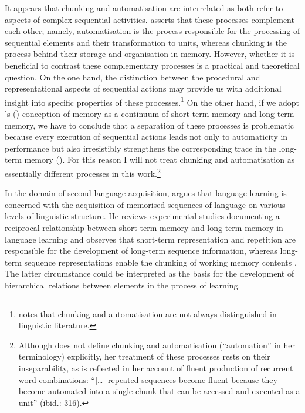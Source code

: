\noindent It appears that chunking and automatisation are interrelated as both refer to aspects of complex sequential activities. \citet[][20]{diessel-toappear} asserts that these processes complement each other; namely, automatisation is the process responsible for the processing of sequential elements and their transformation to units, whereas chunking is the process behind their storage and organisation in memory. However, whether it is beneficial to contrast these complementary processes is a practical and theoretical question. On the one hand, the distinction between the procedural and representational aspects of sequential actions may provide us with additional insight into specific properties of these processes.\footnote{\citet{diessel-toappear} notes that chunking and automatisation are not always distinguished in linguistic literature.} On the other hand, if we adopt \citeauthor{melton-1963}'s (\citeyear[][]{melton-1963}) conception of memory as a continuum of short-term memory and long-term memory, we have to conclude that a separation of these processes is problematic because every execution of sequential actions leads not only to automaticity in performance but also irresistibly strengthens the corresponding trace in the long-term memory (\citealt[cf.][1046]{hay-2001}). For this reason I will not treat chunking and automatisation as essentially different processes in this work.\footnote{Although \citet{bybee-constituency-2002} does not define chunking and automatisation (“automation” in her terminology) explicitly, her treatment of these processes rests on their inseparability, as is reflected in her account of fluent production of recurrent word combinations: ``[\dots] repeated sequences become fluent because they become automated into a single chunk that can be accessed and executed as a unit'' (ibid.: 316).}

In the domain of second-language acquisition, \citet{ellis-1996} argues that language learning is concerned with the acquisition of memorised sequences of language on various levels of linguistic structure. He reviews experimental studies documenting a reciprocal relationship between short-term memory and long-term memory in language learning and observes that short-term representation and repetition are responsible for the development of long-term sequence information, whereas long-term sequence representations enable the chunking of working memory contents \citep[][115]{ellis-1996}. The latter circumstance could be interpreted as the basis for the development of hierarchical relations between elements in the process of learning. 

